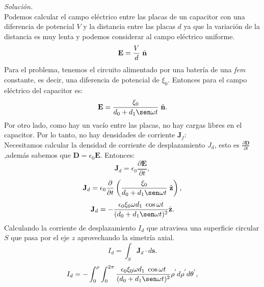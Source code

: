 \documentclass[11pt,fleqn]{book} %
\begin{document}
\begin{example}
\emph{Soluci\'on.}\\
Podemos calcular el campo el\'ectrico entre las placas de un capacitor con una diferencia de potencial $V$ y la distancia entre las placas $d$ ya que la variaci\'on de la distancia es muy lenta y podemos considerar al campo el\'ectrico uniforme.
\begin{eqnarray*}
\textbf{E}=\frac{V}{d} \hspace{1mm} \hat{\textbf{n}}
\end{eqnarray*}
Para el problema, tenemos el circuito alimentado por una bater\'ia de una \emph{fem} constante, es decir, una diferencia de potencial de $\xi_{0}$. Entonces para el campo el\'ectrico del capacitor es:
\begin{equation}
\textbf{E}=\frac{\xi_{0}}{d_{0}+d_{1}\sen\omega t}\hspace{1mm} \hat{\textbf{n}}.
\end{equation}
Por otro lado, como hay un vac\'io entre las placas, no hay cargas libres en el capacitor. Por lo tanto, no hay densidades de corriente $\textbf{J}_{f}$:\\
Necesitamos calcular la densidad de corriente de desplazamiento $J_{d}$, esto es $\frac{\partial \textbf{D}}{\partial t}$,adem\'as sabemos que $\textbf{D}=\epsilon_{0}\textbf{E}$. Entonces:\\
\begin{equation}
\textbf{J}_{d}=\epsilon_{0}\frac{\partial \textbf{E}}{\partial t},
\end{equation}
\begin{eqnarray*}
\textbf{J}_{d}=\epsilon_{0}\frac{\partial}{\partial t} \left( \frac{\xi_{0}}{d_{0}+d_{1}\sen
\omega t}\hspace{1mm} \hat{\textbf{z}} \right),
\end{eqnarray*}
\begin{equation}
\textbf{J}_{d}=-\frac{\epsilon_{0}\xi_{0}\omega d_{1} \hspace{1mm} \cos \omega t }{(d_{0}+d_{1}\sen\omega t)^{2}}  \hat{\textbf{z}}.
\end{equation}
Calculando la corriente de desplazamiento $I_{d}$ que atraviesa una superficie circular $S$ que pasa por el eje $z$ aprovechando la simetr\'ia axial.
\begin{equation}
I_{d}=\int_{S} \textbf{J}_{d} \cdot d\textbf{s}.
\end{equation}
\begin{eqnarray*}
I_{d}=-\int_{0}^{\rho} \int_{0}^{2\pi} \frac{\epsilon_{0}\xi_{0}\omega d_{1} \hspace{1mm} \cos \omega t }{(d_{0}+d_{1}\sen\omega t)^{2}}  \rho^{'} d\rho^{'} d\theta^{'},

\end{eqnarray*}
\end{example}
\end{document}
